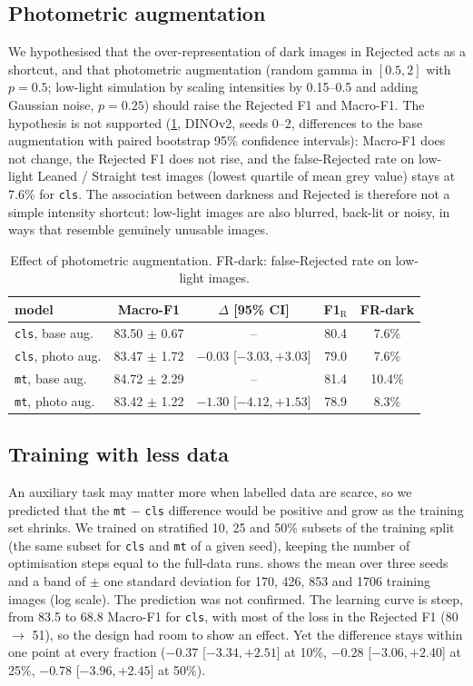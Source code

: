 \documentclass[11pt]{article}
\newcommand{\cls}{\texttt{cls}}
\newcommand{\mt}{\texttt{mt}}
\begin{document}
\subsection{Photometric augmentation}
\label{sec:h1}
We hypothesised that the over-representation of dark images in Rejected acts as a shortcut, and that photometric
augmentation (random gamma in $[0.5, 2]$ with $p = 0.5$; low-light simulation by scaling intensities by
0.15--0.5 and adding Gaussian noise, $p = 0.25$) should raise the Rejected F1 and Macro-F1.
The hypothesis is not supported (\cref{tab:h1}, DINOv2, seeds 0--2, differences to the base augmentation
with paired bootstrap 95\% confidence intervals): Macro-F1 does not change, the Rejected F1 does not rise, and the
false-Rejected rate on low-light Leaned / Straight test images (lowest quartile of mean grey value) stays at
7.6\% for \cls{}. The association between darkness and Rejected is therefore not a simple intensity
shortcut: low-light images are also blurred, back-lit or noisy, in ways that resemble genuinely unusable
images.

\begin{table}[t]
\centering
\caption{Effect of photometric augmentation. FR-dark: false-Rejected rate on low-light images.}
\label{tab:h1}
\small
\begin{tabular}{lcccc}
\toprule
model & Macro-F1 & $\Delta$ [95\% CI] & F1$_\mathrm{R}$ & FR-dark \\
\midrule
\cls{}, base aug.  & 83.50 $\pm$ 0.67 & --                       & 80.4 & 7.6\% \\
\cls{}, photo aug. & 83.47 $\pm$ 1.72 & $-0.03$ [$-3.03, +3.03$] & 79.0 & 7.6\% \\
\mt{}, base aug.   & 84.72 $\pm$ 2.29 & --                       & 81.4 & 10.4\% \\
\mt{}, photo aug.  & 83.42 $\pm$ 1.22 & $-1.30$ [$-4.12, +1.53$] & 78.9 & 8.3\% \\
\bottomrule
\end{tabular}
\end{table}

\subsection{Training with less data}
\label{sec:h3}
An auxiliary task may matter more when labelled data are scarce, so we predicted that the \mt{} $-$ \cls{}
difference would be positive and grow as the training set shrinks. We trained on stratified 10, 25 and 50\%
subsets of the training split (the same subset for \cls{} and \mt{} of a given seed), keeping the number of
optimisation steps equal to the full-data runs.  shows the mean over three seeds and a band
of $\pm$ one standard deviation for 170, 426, 853 and 1706 training images (log scale). The prediction was
not confirmed. The
learning curve is steep, from 83.5 to 68.8 Macro-F1 for \cls{}, with most of the loss in the Rejected F1 (80
$\rightarrow$ 51), so the design had room to show an effect. Yet the difference stays within one point at every
fraction ($-0.37$ [$-3.34, +2.51$] at 10\%, $-0.28$ [$-3.06, +2.40$] at 25\%, $-0.78$ [$-3.96, +2.45$] at
50\%).
\end{document}
